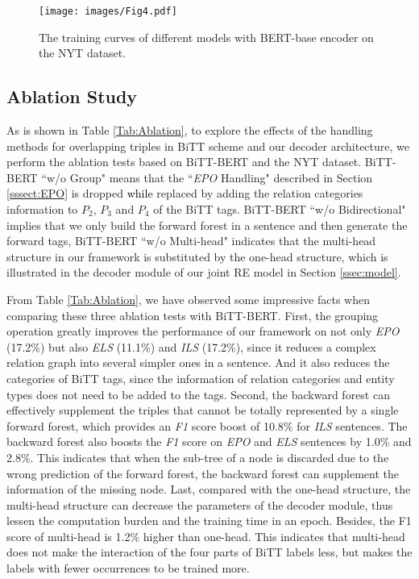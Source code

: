 \documentclass[conference]{IEEEtran}
\newcommand{\yankun}[1]{\textcolor{black}{#1}}
\begin{document}
\begin{figure}[t]
    \centering
    \texttt{[image: images/Fig4.pdf]}\\
    \caption{The training curves of different models with BERT-base encoder on the NYT dataset.}
    \label{Fig:Training}
\end{figure}











\subsection{Ablation Study}
As is shown in Table \ref{Tab:Ablation}, to explore the effects of the handling methods for overlapping triples in BiTT scheme and our decoder architecture, we perform the ablation tests based on BiTT-BERT and the NYT dataset. BiTT-BERT ``w/o Group" means that the ``\emph{EPO} Handling" described in Section \ref{sssect:EPO} is dropped \yankun{while} replaced by adding the relation categories information to $P_2$, $P_3$ and $P_4$ of the BiTT tags. BiTT-BERT ``w/o Bidirectional" implies that we only build the forward forest in a sentence and then generate the forward tags, 
BiTT-BERT ``w/o Multi-head" indicates that the multi-head structure in our framework is substituted by the one-head structure, which is illustrated in the decoder module of our joint RE model in Section \ref{ssec:model}.

From Table \ref{Tab:Ablation}, we have observed some impressive facts when comparing these three ablation tests with BiTT-BERT. First, the grouping operation greatly improves the performance of our framework on not only \emph{EPO} (17.2\%) but also \emph{ELS} (11.1\%) and \emph{ILS} (17.2\%), since it reduces a complex relation graph into several simpler ones in a sentence. And it also reduces the categories of BiTT tags, since the information of relation categories and entity types does not need to be added to the tags. Second, the backward forest can effectively supplement the triples that cannot be totally represented by a single forward forest, which provides an \emph{F1} score boost of 10.8\% for \emph{ILS} sentences. The backward forest also boosts the \emph{F1} score on \emph{EPO} and \emph{ELS} sentences by 1.0\% and 2.8\%. This indicates that when the sub-tree of a node is discarded due to the wrong prediction of the forward forest, the backward forest can supplement the information of the missing node. Last, compared with the one-head structure, the multi-head structure can decrease the parameters of the decoder module, thus lessen the computation burden and the training time in an epoch. Besides, the F1 score of multi-head is 1.2\% higher than one-head. This indicates that multi-head does not make the interaction of the four parts of BiTT labels less, but makes the labels with fewer occurrences to be trained more.
\end{document}
